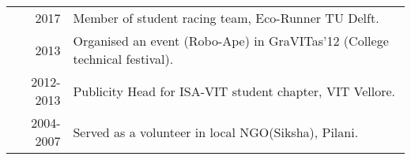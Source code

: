 %
%





\begin{tabular}{rl}	
	2017 & Member of student racing team, Eco-Runner TU Delft.\\
	2013 & Organised an event (Robo-Ape) in GraVITas'12 (College technical festival). \\
	2012-2013 & Publicity Head for ISA-VIT student chapter, VIT Vellore. \\
	2004-2007 & Served as a volunteer in local NGO(Siksha), Pilani.\\
\end{tabular}